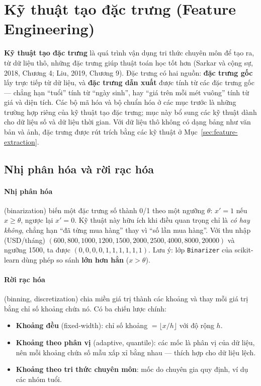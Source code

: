 \section{Kỹ thuật tạo đặc trưng (Feature Engineering)}
\label{sec:feature-eng}

\textbf{Kỹ thuật tạo đặc trưng} là quá trình vận dụng tri thức chuyên môn để tạo ra, từ dữ liệu thô, những đặc trưng giúp thuật toán học tốt hơn (Sarkar và cộng sự, 2018, Chương 4; Liu, 2019, Chương 9). Đặc trưng có hai nguồn: \textbf{đặc trưng gốc} lấy trực tiếp từ dữ liệu, và \textbf{đặc trưng dẫn xuất} được tính từ các đặc trưng gốc --- chẳng hạn ``tuổi'' tính từ ``ngày sinh'', hay ``giá trên mỗi mét vuông'' tính từ giá và diện tích. Các bộ mã hóa và bộ chuẩn hóa ở các mục trước là những trường hợp riêng của kỹ thuật tạo đặc trưng; mục này bổ sung các kỹ thuật dành cho dữ liệu số và dữ liệu thời gian. Với dữ liệu thô không có dạng bảng như văn bản và ảnh, đặc trưng được rút trích bằng các kỹ thuật ở Mục~\ref{sec:feature-extraction}.

\subsection{Nhị phân hóa và rời rạc hóa}

\paragraph{Nhị phân hóa} (binarization) biến một đặc trưng số thành 0/1 theo một ngưỡng $\theta$: $x' = 1$ nếu $x \geq \theta$, ngược lại $x' = 0$. Kỹ thuật này hữu ích khi điều quan trọng chỉ là \textit{có hay không}, chẳng hạn ``đã từng mua hàng'' thay vì ``số lần mua hàng''. Với thu nhập (USD/tháng) $(600, 800, 1000, 1200, 1500, 2000, 2500, 4000, 8000, 20000)$ và ngưỡng 1500, ta được $(0, 0, 0, 0, 1, 1, 1, 1, 1, 1)$. Lưu ý: lớp \texttt{Binarizer} của scikit-learn dùng phép so sánh \textbf{lớn hơn hẳn} ($x > \theta$).

\paragraph{Rời rạc hóa} (binning, discretization) chia miền giá trị thành các khoảng và thay mỗi giá trị bằng chỉ số khoảng chứa nó. Có ba chiến lược chính:
\begin{itemize}
    \item \textbf{Khoảng đều} (fixed-width): chỉ số khoảng $= \lfloor x / h \rfloor$ với độ rộng $h$.
    \item \textbf{Khoảng theo phân vị} (adaptive, quantile): các mốc là phân vị của dữ liệu, nên mỗi khoảng chứa số mẫu xấp xỉ bằng nhau --- thích hợp cho dữ liệu lệch.
    \item \textbf{Khoảng theo tri thức chuyên môn}: mốc do chuyên gia quy định, ví dụ các nhóm tuổi.
\end{itemize}


